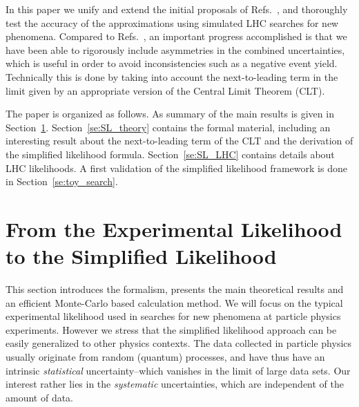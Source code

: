 \documentclass[11pt]{article}
\begin{document}
In this paper we unify and extend the initial proposals of Refs.~\cite{Fichet:2016gvx,SL_note}, and thoroughly test the accuracy of the approximations using simulated LHC searches for new phenomena.
Compared to Refs.~\cite{Fichet:2016gvx,SL_note}, an important progress accomplished is that we have been able to rigorously include asymmetries in the combined uncertainties, which is useful in order to avoid inconsistencies such as a negative event yield. Technically this is done by taking into account the next-to-leading term in the limit given by an appropriate version of the Central Limit Theorem (CLT).

The paper is organized as follows. As summary of the main results is given in Section~\ref{se:EL_SL}. Section~\ref{se:SL_theory} contains the formal material, including
an interesting result about the next-to-leading term of the CLT and the derivation of the simplified likelihood formula. Section~\ref{se:SL_LHC} contains details about LHC likelihoods. A first validation of the simplified likelihood framework is done in Section~\ref{se:toy_search}.



\section{From the Experimental Likelihood to the Simplified Likelihood}
\label{se:EL_SL}

This section introduces the formalism, presents the main theoretical results and an efficient Monte-Carlo based calculation method. We will focus on the typical experimental likelihood used in searches for new phenomena at particle physics experiments. However we stress that the simplified likelihood approach can be easily generalized to other physics contexts.
The data collected in particle physics usually originate from random (quantum) processes, and have thus have an intrinsic \textit{statistical} uncertainty--which vanishes in the limit of large data sets. Our interest rather lies in the \textit{systematic} uncertainties, which are independent of the amount of data.
\end{document}
